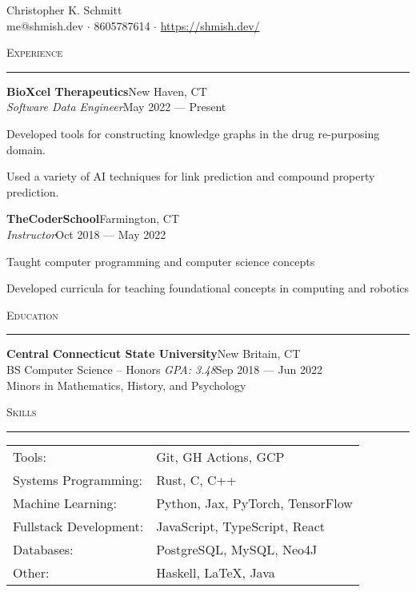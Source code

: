 \documentclass[a4paper]{article}
\newenvironment{cvsection}[1]{%
    \noindent
    \textsc{#1}
    \vspace{4pt}
    \hrule
    \vspace{4pt}
}{\vspace{2pt}}
\newcommand{\school}[6] {
    \noindent\textbf{#1}\hfill#2\\
    \noindent#3 \textit{GPA: #4}\hfill#5\\
    \noindent\vspace{8pt}Minors in #6\\
}
\newcommand{\employer}[5] {
    \noindent\textbf{#1}\hfill#2\\
    \noindent\textit{#3}\hfill#4
    \begin{compactitem}
        #5
    \end{compactitem}
    \vspace{16pt}
}
\begin{document}
    \begin{center}
        {\huge Christopher K. Schmitt}\\
        \vspace{8pt}
        me@shmish.dev $\cdot$ 8605787614 $\cdot$ \href{https://shmish.dev/}{https://shmish.dev/}
    \end{center}

    \begin{cvsection}{Experience}
        \employer{BioXcel Therapeutics}{New Haven, CT}{Software Data Engineer}{May 2022 --- Present}{
            \item Developed tools for constructing knowledge graphs in the drug re-purposing domain.
            \item Used a variety of AI techniques for link prediction and compound property prediction.
        }

        \employer{TheCoderSchool}{Farmington, CT}{Instructor}{Oct 2018 --- May 2022}{
            \item Taught computer programming and computer science concepts
            \item Developed curricula for teaching foundational concepts in computing and robotics
        }
    \end{cvsection}

    \begin{cvsection}{Education}
        \school{Central Connecticut State University}{New Britain, CT}{BS Computer Science -- Honors}{3.48}{Sep 2018 --- Jun 2022}{Mathematics, History, and Psychology}
    \end{cvsection}

    \begin{cvsection}{Skills}
        \begin{tabular}{ l l }
            Tools:                      & Git, GH Actions, GCP\\
            Systems Programming:        & Rust, C, C++\\
            Machine Learning:           & Python, Jax, PyTorch, TensorFlow\\
            Fullstack Development:      & JavaScript, TypeScript, React\\
            Databases:                  & PostgreSQL, MySQL, Neo4J\\
            Other:                      & Haskell, LaTeX, Java\\
        \end{tabular}
        \vspace{16pt}
    \end{cvsection}
\end{document}

